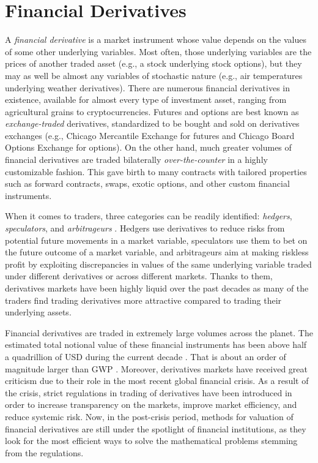 \documentclass{UUThesisTemplate}
\begin{document}
\chapter{Financial Derivatives}
\label{ch:finder}
\par A \emph{financial derivative} is a market instrument whose value depends on the values of some other underlying variables. Most often, those underlying variables are the prices of another traded asset (e.g., a stock underlying stock options), but they may as well be almost any variables of stochastic nature (e.g., air temperatures underlying weather derivatives). There are numerous financial derivatives in existence, available for almost every type of investment asset, ranging from agricultural grains to cryptocurrencies. Futures and options are best known as \emph{exchange-traded} derivatives, standardized to be bought and sold on derivatives exchanges (e.g., Chicago Mercantile Exchange for futures and Chicago Board Options Exchange for options). On the other hand, much greater volumes of financial derivatives are traded bilaterally \emph{over-the-counter} in a highly customizable fashion. This gave birth to many contracts with tailored properties such as forward contracts, swaps, exotic options, and other custom financial instruments.
\par When it comes to traders, three categories can be readily identified: \emph{hedgers}, \emph{speculators}, and \emph{arbitrageurs} \cite{hull2017options}. Hedgers use derivatives to reduce risks from potential future movements in a market variable, speculators use them to bet on the future outcome of a market variable, and arbitrageurs aim at making riskless profit by exploiting discrepancies in values of the same underlying variable traded under different derivatives or across different markets. Thanks to them, derivatives markets have been highly liquid over the past decades as many of the traders find trading derivatives more attractive compared to trading their underlying assets.
\par Financial derivatives are traded in extremely large volumes across the planet. %
The estimated total notional value of these financial instruments has been above half a quadrillion of USD during the current decade \cite{bank2018annual}. That is about an order of magnitude larger than GWP \cite{worldgdp2018annual}. Moreover, derivatives markets have received great criticism due to their role in the most recent global financial crisis.  As a result of the crisis, strict regulations in trading of derivatives have been introduced in order to increase transparency on the markets, improve market efficiency, and reduce systemic risk. Now, in the post-crisis period, methods for valuation of financial derivatives are still under the spotlight of financial institutions, as they look for the most efficient ways to solve the mathematical problems stemming from the regulations.
\end{document}

